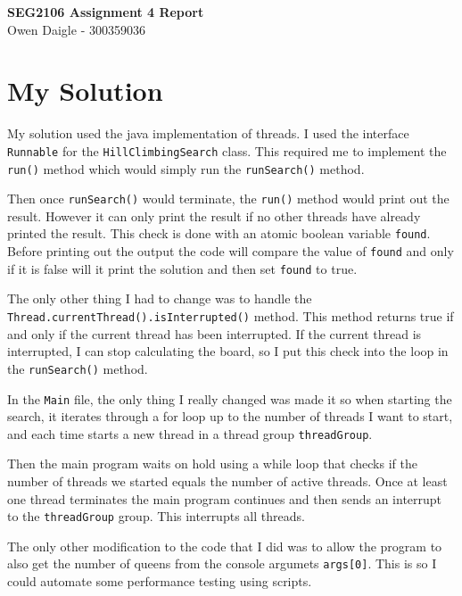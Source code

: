 \documentclass[12pt,letterpaper]{article} \usepackage{amsmath} \usepackage{graphicx} \usepackage[margin=1in]{geometry} \usepackage{longtable}  \usepackage{amssymb}
\begin{document}
	\begin{center}
		\Large\textbf{SEG2106 Assignment 4 Report} \\
		Owen Daigle - 300359036
		\vspace{0.5em}
	\end{center}

	\section{My Solution}
	
	My solution used the java implementation of threads. I used the interface \verb*|Runnable| for the \verb*|HillClimbingSearch|  class. This required me to implement the \verb*|run()| method which would simply run the \verb*|runSearch()| method. 
	
	Then once \verb*|runSearch()| would terminate, the \verb*|run()| method would print out the result. However it can only print the result if no other threads have already printed the result. This check is done with an atomic boolean variable \verb|found|. Before printing out the output the code will compare the value of \verb*|found| and only if it is false will it print the solution and then set \verb*|found| to true. 
	
	The only other thing I had to change was to handle the \verb*|Thread.currentThread().isInterrupted()| method. This method returns true if and only if the current thread has been interrupted. If the current thread is interrupted, I can stop calculating the board, so I put this check into the loop in the \verb*|runSearch()| method. 
	
	In the \verb*|Main| file, the only thing I really changed was made it so when starting the search, it iterates through a for loop up to the number of threads I want to start, and each time starts a new thread in a thread group \verb*|threadGroup|. 
	
	Then the main program waits on hold using a while loop that checks if the number of threads we started equals the number of active threads. Once at least one thread terminates the main program continues and then sends an interrupt to the \verb*|threadGroup| group. This interrupts all threads. 
	
	The only other modification to the code that I did was to allow the program to also get the number of queens from the console argumets \verb*|args[0]|. This is so I could automate some performance testing using scripts. 
	
	
	
\end{document}
